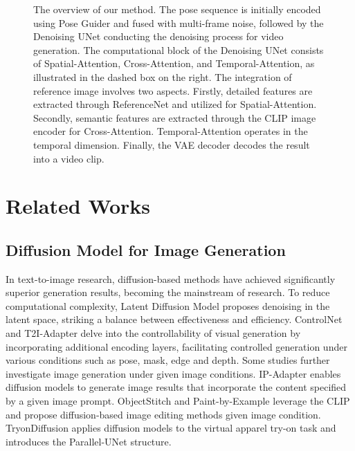\begin{figure*}[!t]
\begin{center}
	\setlength{\fboxrule}{0pt}
\end{center}
\vspace{-0.5cm}
\caption{The overview of our method. The pose sequence is initially encoded using Pose Guider and fused with multi-frame noise, followed by the Denoising UNet conducting the denoising process for video generation. The computational block of the Denoising UNet consists of Spatial-Attention, Cross-Attention, and Temporal-Attention, as illustrated in the dashed box on the right. The integration of reference image involves two aspects. Firstly, detailed features are extracted through ReferenceNet and utilized for Spatial-Attention. Secondly, semantic features are extracted through the CLIP image encoder for Cross-Attention. Temporal-Attention operates in the temporal dimension. Finally, the VAE decoder decodes the result into a video clip.}
\vspace{-0.3cm}
\label{fig:overview}
\end{figure*}

\section{Related Works}

\subsection{Diffusion Model for Image Generation }
In text-to-image research, diffusion-based methods\cite{dalle2,imagen,ldm,glide,ediffi,composer} have achieved significantly superior generation results, becoming the mainstream of research. To reduce computational complexity, Latent Diffusion Model\cite{ldm} proposes denoising in the latent space, striking a balance between effectiveness and efficiency. ControlNet\cite{controlnet} and T2I-Adapter\cite{t2iadapter} delve into the controllability of visual generation by incorporating additional encoding layers, facilitating controlled generation under various conditions such as pose, mask, edge and depth. Some studies further investigate image generation under given image conditions. IP-Adapter\cite{ip} enables diffusion models to generate image results that incorporate the content specified by a given image prompt. ObjectStitch\cite{objectstitch} and Paint-by-Example\cite{paint} leverage the CLIP\cite{clip} and propose diffusion-based image editing methods given image condition. TryonDiffusion\cite{tryondiffusion} applies diffusion models to the virtual apparel try-on task and introduces the Parallel-UNet structure. 

